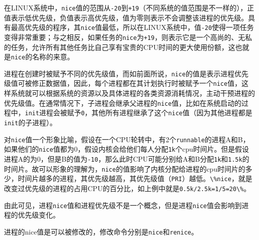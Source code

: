 \documentclass[doctor,openright,twoside]{sjtuthesis}
\newcommand{\passthrough}[1]{#1}
\theoremstyle{plain}
\theoremstyle{definition}
\theoremstyle{remark}
\theoremstyle{ocrenumbox}
\theoremstyle{plain}
\begin{document}
在LINUX系统中，\passthrough{\lstinline!nice!}值的范围从\passthrough{\lstinline!-20!}到\passthrough{\lstinline!+19!}（不同系统的值范围是不一样的），正值表示低优先级，负值表示高优先级，值为零则表示不会调整该进程的优先级。具有最高优先级的程序，其\passthrough{\lstinline!nice!}值最低，所以在LINUX系统中，值\passthrough{\lstinline!-20!}使得一项任务变得非常重要；与之相反，如果任务的\passthrough{\lstinline!nice!}为\passthrough{\lstinline!+19!}，则表示它是一个高尚的、无私的任务，允许所有其他任务比自己享有宝贵的CPU时间的更大使用份额，这也就是\passthrough{\lstinline!nice!}的名称的来意。

进程在创建时被赋予不同的优先级值，而如前面所说，\passthrough{\lstinline!nice!}的值是表示进程优先级值可被修正数据值，因此，每个进程都在其计划执行时被赋予一个\passthrough{\lstinline!nice!}值，这样系统就可以根据系统的资源以及具体进程的各类资源消耗情况，主动干预进程的优先级值。在通常情况下，子进程会继承父进程的\passthrough{\lstinline!nice!}值，比如在系统启动的过程中，\passthrough{\lstinline!init!}进程会被赋予\passthrough{\lstinline!0!}，其他所有进程继承了这个\passthrough{\lstinline!nice!}值（因为其他进程都是\passthrough{\lstinline!init!}的子进程）。

对\passthrough{\lstinline!nice!}值一个形象比喻，假设在一个CPU轮转中，有2个\passthrough{\lstinline!runnable!}的进程A和B，如果他们的\passthrough{\lstinline!nice!}值都为0，假设内核会给他们每人分配\passthrough{\lstinline!1k!}个cpu时间片。但是假设进程A的为0，但是B的值为\passthrough{\lstinline!-10!}，那么此时CPU可能分别给A和B分配\passthrough{\lstinline!1k!}和\passthrough{\lstinline!1.5k!}的时间片。故可以形象的理解为，\passthrough{\lstinline!nice!}的值影响了内核分配给进程的cpu时间片的多少，时间片越多的进程，其优先级越高，其优先级值（\passthrough{\lstinline!PRI!}）越低。\passthrough{\lstinline!\%nice!}，就是改变过优先级的进程的占用CPU的百分比，如上例中就是\passthrough{\lstinline!0.5k/2.5k=1/5=20\%!}。

由此可见，进程\passthrough{\lstinline!nice!}值和进程优先级不是一个概念，但是进程\passthrough{\lstinline!nice!}值会影响到进程的优先级变化。

进程的nice值是可以被修改的，修改命令分别是\passthrough{\lstinline!nice!}和\passthrough{\lstinline!renice!}。
\end{document}
